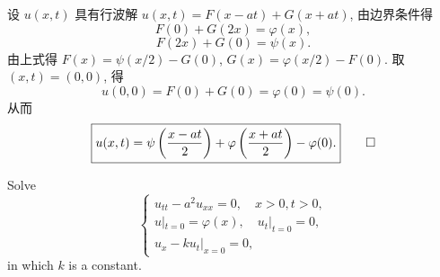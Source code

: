 \begin{solve}
  设 $u(x,t)$ 具有行波解 $u(x,t) = F(x-at)+G(x+at)$, 由边界条件得
  \[F(0)+G(2x) = \varphi(x),\]
  \[F(2x)+G(0) = \psi(x).\]
  由上式得 $F(x) = \psi(x/2)-G(0)$, $G(x) = \varphi(x/2)-F(0)$.
  取 $(x,t) = (0,0)$, 得
  \[u(0,0) = F(0) + G(0) = \varphi(0) = \psi(0).\]
  从而
  \[ \boxed{u(x,t) = \psi\left(\frac{x-at}{2}\right)
    + \varphi\left(\frac{x+at}{2}\right)-\varphi(0).} \qedhere\]
\end{solve}


\begin{exercise}[5]
  Solve
  \[\begin{cases}
    u_{tt} - a^2 u_{xx} = 0,\quad x>0, t>0, \\
    u|_{t=0} = \varphi(x),\quad u_t|_{t=0} = 0, \\
    u_x - ku_t|_{x=0} = 0,
  \end{cases}\]
  in which $k$ is a constant.
\end{exercise}


